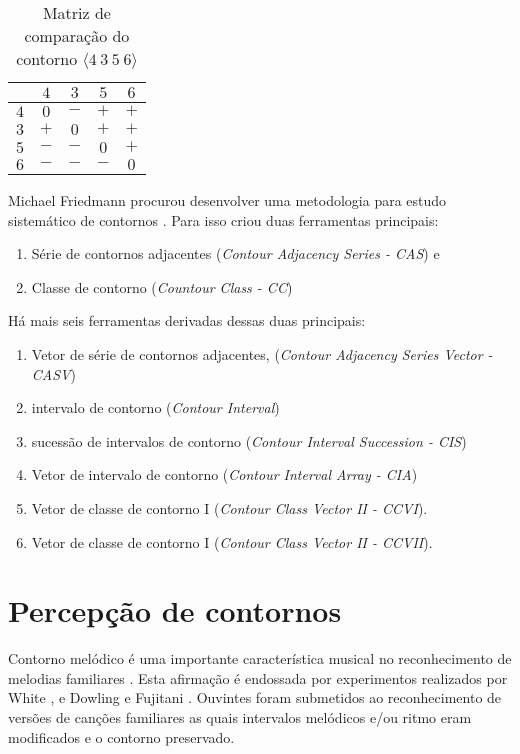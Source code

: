 \documentclass[12pt,brazil]{book}
\newcommand{\eng}[1]{\textit{#1}}
\begin{document}
\begin{table}
  \centering
  \begin{tabular}{r|cccc}
    & $4$ & $3$ & $5$ & $6$ \\
    \hline
    $4$ & $0$ & $-$ & $+$ & $+$ \\
    $3$ & $+$ & $0$ & $+$ & $+$ \\
    $5$ & $-$ & $-$ & $0$ & $+$ \\
    $6$ & $-$ & $-$ & $-$ & $0$ \\
  \end{tabular}
  \caption{Matriz de comparação do contorno $\langle 4\:3\:5\:6 \rangle$}
\label{tab:matriz-4356}
\end{table}

Michael Friedmann procurou desenvolver uma metodologia para estudo
sistemático de contornos \cite{friedmann85:methodology}. Para isso
criou duas ferramentas principais:

\begin{enumerate}
\item Série de contornos adjacentes (\eng{Contour Adjacency Series -
    CAS}) e
\item Classe de contorno (\eng{Countour Class - CC})
\end{enumerate}

Há mais seis ferramentas derivadas dessas duas principais:

\begin{enumerate}
\item Vetor de série de contornos adjacentes, (\eng{Contour Adjacency
    Series Vector - CASV})
\item intervalo de contorno (\eng{Contour Interval})
\item sucessão de intervalos de contorno (\eng{Contour Interval
    Succession - CIS})
\item Vetor de intervalo de contorno (\eng{Contour Interval Array -
    CIA})
\item Vetor de classe de contorno I (\eng{Contour Class Vector II -
    CCVI}).
\item Vetor de classe de contorno I (\eng{Contour Class Vector II -
    CCVII}).
\end{enumerate}

\section{Percepção de contornos}
\label{sec:perc-de-cont}

Contorno melódico é uma importante característica musical no
reconhecimento de melodias familiares
\cite[p. 136]{dowling.ea86:music}. Esta afirmação é endossada por
experimentos realizados por White \cite{white60:recognition}, e
Dowling e Fujitani \cite{dowling.ea71:contour}. Ouvintes foram
submetidos ao reconhecimento de versões de canções familiares as quais
intervalos melódicos e/ou ritmo eram modificados e o contorno
preservado.
\end{document}
